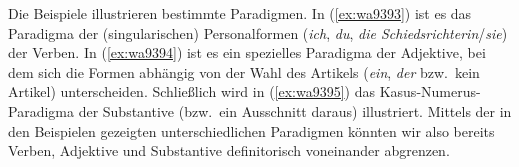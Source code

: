 \begin{exe}
  \ex \label{ex:wa9393}
  \begin{xlist}
  \end{xlist}
  \ex \label{ex:wa9394}
  \begin{xlist}
  \end{xlist}
  \ex \label{ex:wa9395}
  \begin{xlist}
  \end{xlist}
\end{exe}

Die Beispiele illustrieren bestimmte Paradigmen.
In (\ref{ex:wa9393}) ist es das Paradigma der (singularischen) Personalformen (\textit{ich}, \textit{du}, \textit{die Schiedsrichterin}/\textit{sie}) der Verben.
In (\ref{ex:wa9394}) ist es ein spezielles Paradigma der Adjektive, bei dem sich die Formen abhängig von der Wahl des Artikels (\textit{ein}, \textit{der} bzw.\ kein Artikel) unterscheiden.
Schließlich wird in (\ref{ex:wa9395}) das Kasus-Numerus-Paradigma der Substantive (bzw.\ ein Ausschnitt daraus) illustriert.
Mittels der in den Beispielen gezeigten unterschiedlichen Paradigmen könnten wir also bereits Verben, Adjektive und Substantive definitorisch voneinander abgrenzen.

